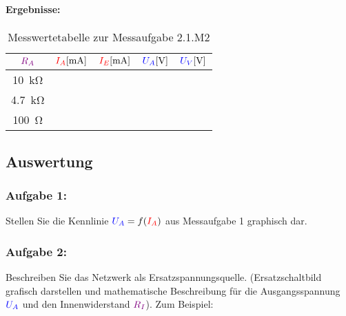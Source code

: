 \documentclass[11pt,a4paper,titlepage,parskip=half]{scrreprt}
\begin{document}
               \paragraph{Ergebnisse:}
                   \begin{center}
                       \begin{table}[!hbtp]
                           \caption{Messwertetabelle zur Messaufgabe 2.1.M2}
                           \label{tbl:messergebnisse2.2}
                           \renewcommand{\arraystretch}{1.3}
                           \begin{center}
                               \begin{tabular}{c|c|c|c|c}
                                   $\textcolor{violet}{R_A}$&
                                   $\textcolor{red}{I_A} [\si{\milli\ampere}]$  &
                                   $\textcolor{red}{I_E} [\si{\milli\ampere}]$ &
                                   $\textcolor{blue}{U_A} [\si{\volt}]$ &
                                   $\textcolor{blue}{U_V} [\si{\volt}]$ \\ \hline

                                   \SI{10}{\kilo\ohm} & \qquad\qquad & \qquad\qquad & \qquad\qquad & \qquad\qquad\\\hline
                                   \SI{4,7}{\kilo\ohm} &  &  &  &\\\hline
                                   \SI{100}{\ohm} &  &&  & \\

                               \end{tabular}
                           \end{center}
                       \end{table}
                   \end{center}
         \subsection{Auswertung}
           \subsubsection{Aufgabe 1:} Stellen Sie die Kennlinie $\textcolor{blue}{U_A} = f(\textcolor{red}{I_A})$ aus Messaufgabe 1 graphisch dar.

           \subsubsection{Aufgabe 2:} Beschreiben Sie das Netzwerk als Ersatzspannungsquelle. (Ersatzschaltbild grafisch darstellen und mathematische Beschreibung für die Ausgangsspannung $\textcolor{blue}{U_A}$ und den Innenwiderstand $\textcolor{violet}{R_I}$). Zum Beispiel:\\
          
\end{document}
